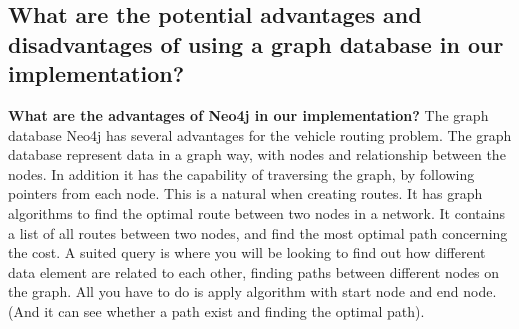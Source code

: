 

\subsection{What are the potential advantages and disadvantages of using a graph database in our implementation?}

\textbf{What are the advantages of Neo4j in our implementation?}
The graph database Neo4j has several advantages for the vehicle routing problem. The graph database represent data in a graph way, with nodes and relationship between the nodes. In addition it has the capability of traversing the graph, by following pointers from each node. This is a natural when creating routes. It has graph algorithms to find the optimal route between two nodes in a network. It contains a list of all routes between two nodes, and find the most optimal path concerning the cost. A suited query is where you will be looking to find out how different data element are related to each other, finding paths between different nodes on the graph. All you have to do is apply algorithm with start node and end node. (And it can see whether a path exist and finding the optimal path). 

